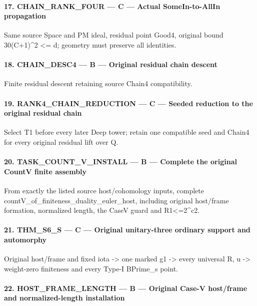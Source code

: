 \paragraph{17. CHAIN\_\allowbreak{}RANK\_\allowbreak{}FOUR — C — Actual SomeIn-to-AllIn propagation}

Same source Space and PM ideal, residual point Good4, original bound 30(C+1)\textasciicircum{}2 <= d; geometry must preserve all identities.


\paragraph{18. CHAIN\_\allowbreak{}DESC4 — B — Original residual chain descent}

Finite residual descent retaining source Chain4 compatibility.


\paragraph{19. RANK4\_\allowbreak{}CHAIN\_\allowbreak{}REDUCTION — C — Seeded reduction to the original residual chain}

Select T1 before every later Deep tower; retain one compatible seed and Chain4 for every original residual lift over Q.


\paragraph{20. TASK\_\allowbreak{}COUNT\_\allowbreak{}V\_\allowbreak{}INSTALL — B — Complete the original CountV finite assembly}

From exactly the listed source host/\allowbreak{}cohomology inputs, complete countV\_\allowbreak{}of\_\allowbreak{}finiteness\_\allowbreak{}duality\_\allowbreak{}euler\_\allowbreak{}host, including original host/\allowbreak{}frame formation, normalized length, the CaseV guard and R1<=2\textasciicircum{}c2.


\paragraph{21. THM\_\allowbreak{}S6\_\allowbreak{}S — C — Original unitary-three ordinary support and automorphy}

Original host/\allowbreak{}frame and fixed iota -> one marked g1 -> every universal R,\allowbreak{} u -> weight-zero finiteness and every Type-I BPrime\_\allowbreak{}s point.


\paragraph{22. HOST\_\allowbreak{}FRAME\_\allowbreak{}LENGTH — B — Original Case-V host/\allowbreak{}frame and normalized-length installation}

